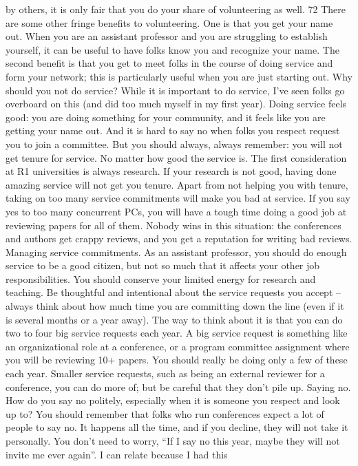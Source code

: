 \documentclass[oneside,11pt]{memoir}
\begin{document}
by others, it is only fair that you do your share of volunteering as well.
72
There are some other fringe benefits to volunteering. One is that you get your name out. When
you are an assistant professor and you are struggling to establish yourself, it can be useful to
have folks know you and recognize your name. The second benefit is that you get to meet folks
in the course of doing service and form your network; this is particularly useful when you are
just starting out.
Why should you not do service? While it is important to do service, I’ve seen folks go overboard
on this (and did too much myself in my first year). Doing service feels good: you are doing
something for your community, and it feels like you are getting your name out. And it is hard to
say no when folks you respect request you to join a committee.
But you should always, always remember: you will not get tenure for service. No matter how
good the service is. The first consideration at R1 universities is always research. If your research
is not good, having done amazing service will not get you tenure.
Apart from not helping you with tenure, taking on too many service commitments will make you
bad at service. If you say yes to too many concurrent PCs, you will have a tough time doing a
good job at reviewing papers for all of them. Nobody wins in this situation: the conferences and
authors get crappy reviews, and you get a reputation for writing bad reviews.
Managing service commitments. As an assistant professor, you should do enough service to be
a good citizen, but not so much that it affects your other job responsibilities. You should
conserve your limited energy for research and teaching. Be thoughtful and intentional about the
service requests you accept – always think about how much time you are committing down the
line (even if it is several months or a year away). The way to think about it is that you can do two
to four big service requests each year. A big service request is something like an organizational
role at a conference, or a program committee assignment where you will be reviewing 10+
papers. You should really be doing only a few of these each year. Smaller service requests, such
as being an external reviewer for a conference, you can do more of; but be careful that they don’t
pile up.
Saying no. How do you say no politely, especially when it is someone you respect and look up
to? You should remember that folks who run conferences expect a lot of people to say no. It
happens all the time, and if you decline, they will not take it personally. You don’t need to worry,
“If I say no this year, maybe they will not invite me ever again”. I can relate because I had this
\end{document}
